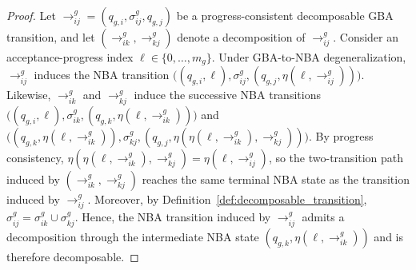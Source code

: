 \documentclass[lettersize,journal]{IEEEtran}
\theoremstyle{italiclemma}
\theoremstyle{italiclemma}
\theoremstyle{definition}
\begin{document}
\begin{proof} \label{l2}
Let $\rightarrow^g_{ij}=(q_{g,i},\sigma^g_{ij},q_{g,j})$ be a progress-consistent decomposable GBA transition, and let $(\rightarrow^g_{ik},\rightarrow^g_{kj})$ denote a decomposition of $\rightarrow^g_{ij}$. Consider an acceptance-progress index $\ell\in\{0,\ldots,m_g\}$. Under GBA-to-NBA degeneralization, $\rightarrow^g_{ij}$ induces the NBA transition $\bigl((q_{g,i},\ell),\sigma^g_{ij},
(q_{g,j},\eta(\ell,\rightarrow^g_{ij}))\bigr).$ Likewise, $\rightarrow^g_{ik}$ and $\rightarrow^g_{kj}$ induce the
successive NBA transitions $\bigl((q_{g,i},\ell),\sigma^g_{ik}, (q_{g,k},\eta(\ell,\rightarrow^g_{ik}))\bigr)$ and $\bigl((q_{g,k},\eta(\ell,\rightarrow^g_{ik})),\sigma^g_{kj}, (q_{g,j}, \eta(\eta(\ell,\rightarrow^g_{ik}),\rightarrow^g_{kj}))\bigr).$  By progress consistency, $\eta(\eta(\ell,\rightarrow^g_{ik}),\rightarrow^g_{kj})
= \eta(\ell,\rightarrow^g_{ij})$, so the two-transition path induced by $(\rightarrow^g_{ik},\rightarrow^g_{kj})$ reaches the same terminal NBA state as the transition induced by $\rightarrow^g_{ij}$. Moreover, by Definition~\ref{def:decomposable_transition}, $\sigma^g_{ij} = \sigma^g_{ik}\cup\sigma^g_{kj}.$ Hence, the NBA transition induced by $\rightarrow^g_{ij}$ admits a
decomposition through the intermediate NBA state
$(q_{g,k},\eta(\ell,\rightarrow^g_{ik}))$ and is therefore
decomposable. 

\end{proof}
\end{document}
